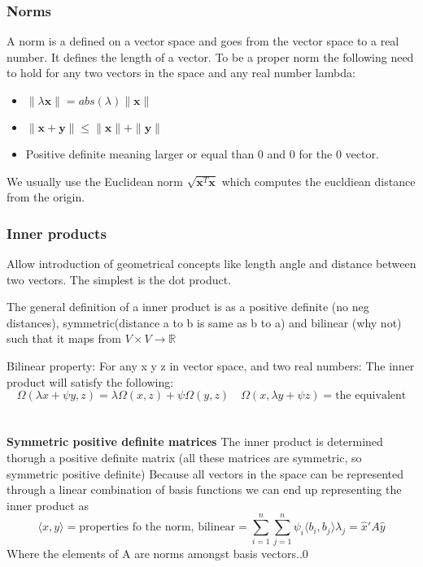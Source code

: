 \documentclass{article}
\begin{document}
\subsubsection{Norms}
A norm is a defined on a vector space and goes from the vector space to a real number. It defines the length of a vector.
To be a proper norm the following need to hold for any two vectors in the space and any real number lambda:
\begin{itemize}
    \item $\| \lambda \textbf{x} \| = abs(\lambda)\|\textbf{x} \|  $
    \item $\|\textbf{x} + \textbf{y} \| \leq \|\textbf{x} \| + \| \textbf{y} \|  $
    \item Positive definite meaning larger or equal than 0 and 0 for the 0 vector.
\end{itemize}
We usually use the Euclidean norm $\sqrt{\textbf{x}^T\textbf{x}}$ which computes
the eucldiean distance from the origin.

\subsubsection{Inner products}
Allow introduction of geometrical concepts like length angle and distance between two vectors.
The simplest is the dot product.

The general definition of a inner product is as a positive definite (no neg distances), symmetric(distance a to b is same as b to a)
and bilinear (why not) such that it maps from $V \times V \rightarrow \mathbb{R} $

Bilinear property: For any x y z in vector space, and two real numbers:
The inner product will satisfy the following: $$
\Omega (\lambda x + \psi y, z) = \lambda\Omega(x,z) + \psi\Omega(y,z)
\quad \Omega (x ,\lambda y + \psi z) = \textrm{the equivalent}
$$
\\
\\
\textbf{Symmetric positive definite matrices}
The inner product is determined thorugh a positive definite matrix (all these matrices are symmetric, so symmetric positive definite)
Because all vectors in the space can be represented through a linear combination of basis functions
we can end up representing the inner product as $$\langle x, y \rangle = \textrm{properties fo the norm, bilinear} =
\sum_{i=1}^{n}\sum_{j=1}^{n} \psi_i \langle b_i, b_j \rangle \lambda_j = \hat{x}'A\hat{y} 
$$
Where the elements of A are norms amongst basis vectors..0
\end{document}
